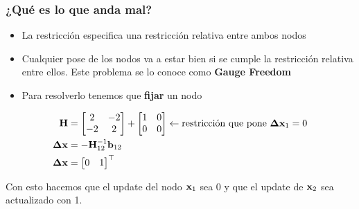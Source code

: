 \begin{frame}
	\frametitle{¿Qué es lo que anda mal?}
    
    \begin{itemize}
        \item La restricción especifica una restricción relativa entre ambos nodos
        \item Cualquier pose de los nodos va a estar bien si se cumple la restricción relativa entre ellos. Este problema se lo conoce como {\bf Gauge Freedom}
        \item Para resolverlo tenemos que {\bf fijar} un nodo 
    \end{itemize}

    \begin{align*}
        \boldsymbol{\mathbf{H}} &=
        \begin{bmatrix}
            2 & -2\\
            -2 & 2
        \end{bmatrix}
        +
        \begin{bmatrix}
            1 & 0\\
            0 & 0
        \end{bmatrix} \leftarrow \text{restricción que pone } \boldsymbol{\mathbf{\Delta}}\boldsymbol{\mathbf{x}}_{1} = 0\\
        \boldsymbol{\mathbf{\Delta}}\boldsymbol{\mathbf{x}} &= -{\boldsymbol{\mathbf{H}}}^{-1}_{12} \boldsymbol{\mathbf{b}}_{12}\\
        \boldsymbol{\mathbf{\Delta}}\boldsymbol{\mathbf{x}} &=
        \begin{bmatrix}
            0 & 1
        \end{bmatrix}^{\top}
    \end{align*}
    
    Con esto hacemos que el update del nodo $\boldsymbol{\mathbf{x}}_{1}$ sea 0 y que el update de $\boldsymbol{\mathbf{x}}_{2}$ sea actualizado con 1.
	
\end{frame}


